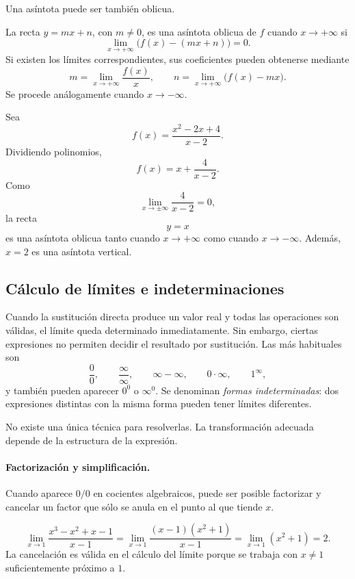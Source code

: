 Una asíntota puede ser también oblicua.

\begin{definition}
La recta $y=mx+n$, con $m\neq0$, es una asíntota oblicua de $f$ cuando $x\to+\infty$ si
\[
\lim_{x\to+\infty}\bigl(f(x)-(mx+n)\bigr)=0.
\]
Si existen los límites correspondientes, sus coeficientes pueden obtenerse mediante
\[
m=\lim_{x\to+\infty}\frac{f(x)}x,
\qquad
n=\lim_{x\to+\infty}\bigl(f(x)-mx\bigr).
\]
Se procede análogamente cuando $x\to-\infty$.
\end{definition}

\begin{example}
Sea
\[
f(x)=\frac{x^2-2x+4}{x-2}.
\]
Dividiendo polinomios,
\[
f(x)=x+\frac{4}{x-2}.
\]
Como
\[
\lim_{x\to\pm\infty}\frac{4}{x-2}=0,
\]
la recta
\[
y=x
\]
es una asíntota oblicua tanto cuando $x\to+\infty$ como cuando $x\to-\infty$. Además, $x=2$ es una asíntota vertical.
\end{example}

\subsection{Cálculo de límites e indeterminaciones}

Cuando la sustitución directa produce un valor real y todas las operaciones son válidas, el límite queda determinado inmediatamente. Sin embargo, ciertas expresiones no permiten decidir el resultado por sustitución. Las más habituales son
\[
\frac00,\qquad \frac{\infty}{\infty},\qquad
\infty-\infty,\qquad 0\cdot\infty,
\qquad 1^\infty,
\]
y también pueden aparecer $0^0$ o $\infty^0$. Se denominan \emph{formas indeterminadas}: dos expresiones distintas con la misma forma pueden tener límites diferentes.

No existe una única técnica para resolverlas. La transformación adecuada depende de la estructura de la expresión.

\paragraph{Factorización y simplificación.}
Cuando aparece $0/0$ en cocientes algebraicos, puede ser posible factorizar y cancelar un factor que sólo se anula en el punto al que tiende $x$.

\begin{example}
\[
\lim_{x\to1}\frac{x^3-x^2+x-1}{x-1}
=\lim_{x\to1}\frac{(x-1)(x^2+1)}{x-1}
=\lim_{x\to1}(x^2+1)=2.
\]
La cancelación es válida en el cálculo del límite porque se trabaja con $x\neq1$ suficientemente próximo a $1$.
\end{example}

